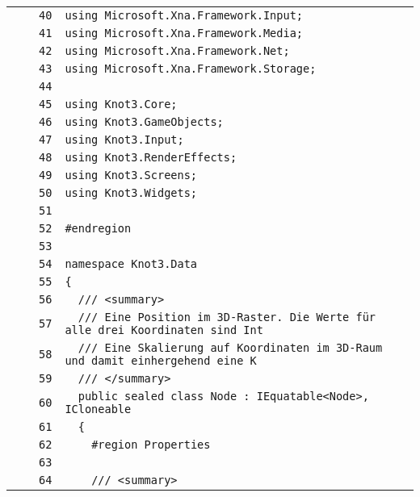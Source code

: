 \documentclass[a4paper,10pt]{article}
\begin{document}
\begin{longtable}[l]{lrrl}
\cellcolor{gray} &  & \verb~40~ & \verb~using Microsoft.Xna.Framework.Input;~\\
\cellcolor{gray} &  & \verb~41~ & \verb~using Microsoft.Xna.Framework.Media;~\\
\cellcolor{gray} &  & \verb~42~ & \verb~using Microsoft.Xna.Framework.Net;~\\
\cellcolor{gray} &  & \verb~43~ & \verb~using Microsoft.Xna.Framework.Storage;~\\
\cellcolor{gray} &  & \verb~44~ & \verb~~\\
\cellcolor{gray} &  & \verb~45~ & \verb~using Knot3.Core;~\\
\cellcolor{gray} &  & \verb~46~ & \verb~using Knot3.GameObjects;~\\
\cellcolor{gray} &  & \verb~47~ & \verb~using Knot3.Input;~\\
\cellcolor{gray} &  & \verb~48~ & \verb~using Knot3.RenderEffects;~\\
\cellcolor{gray} &  & \verb~49~ & \verb~using Knot3.Screens;~\\
\cellcolor{gray} &  & \verb~50~ & \verb~using Knot3.Widgets;~\\
\cellcolor{gray} &  & \verb~51~ & \verb~~\\
\cellcolor{gray} &  & \verb~52~ & \verb~#endregion~\\
\cellcolor{gray} &  & \verb~53~ & \verb~~\\
\cellcolor{gray} &  & \verb~54~ & \verb~namespace Knot3.Data~\\
\cellcolor{gray} &  & \verb~55~ & \verb~{~\\
\cellcolor{gray} &  & \verb~56~ & \verb~  /// <summary>~\\
\cellcolor{gray} &  & \verb~57~ & \verb~  /// Eine Position im 3D-Raster. Die Werte für alle drei Koordinaten sind Int~\\
\cellcolor{gray} &  & \verb~58~ & \verb~  /// Eine Skalierung auf Koordinaten im 3D-Raum und damit einhergehend eine K~\\
\cellcolor{gray} &  & \verb~59~ & \verb~  /// </summary>~\\
\cellcolor{gray} &  & \verb~60~ & \verb~  public sealed class Node : IEquatable<Node>, ICloneable~\\
\cellcolor{gray} &  & \verb~61~ & \verb~  {~\\
\cellcolor{gray} &  & \verb~62~ & \verb~    #region Properties~\\
\cellcolor{gray} &  & \verb~63~ & \verb~~\\
\cellcolor{gray} &  & \verb~64~ & \verb~    /// <summary>~\\

\end{longtable}
\end{document}
